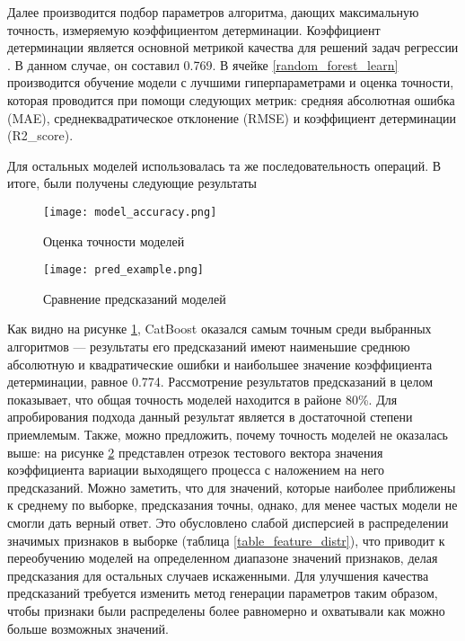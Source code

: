 Далее производится подбор параметров алгоритма, дающих максимальную точность, измеряемую коэффициентом детерминации. Коэффициент детерминации является основной метрикой качества для решений задач регрессии \cite{gomar2011validation}. В данном случае, он составил 0.769.
В ячейке \ref{random_forest_learn} производится обучение модели с лучшими гиперпараметрами и оценка точности, которая проводится при помощи следующих метрик:  средняя абсолютная ошибка (MAE), среднеквадратическое отклонение (RMSE) и коэффициент детерминации (R2\_score).

Для остальных моделей использовалась та же последовательность операций. В итоге, были получены следующие результаты
\begin{figure}[H]
	\centering
	\texttt{[image: model\_accuracy.png]}
	\caption{Оценка точности моделей}
	\label{model_accuracy}
\end{figure}
\begin{figure}[H]
	\centering
	\texttt{[image: pred\_example.png]}
	\caption{Сравнение предсказаний моделей}
	\label{pred_example}
\end{figure}
Как видно на рисунке \ref{model_accuracy}, CatBoost оказался самым точным среди выбранных алгоритмов --- результаты его предсказаний имеют наименьшие среднюю абсолютную и квадратические ошибки и наибольшее значение коэффициента детерминации, равное 0.774. Рассмотрение результатов предсказаний в целом показывает, что общая точность моделей находится в районе 80\%. Для апробирования подхода данный результат является в достаточной степени приемлемым. Также, можно предложить, почему точность моделей не оказалась выше: на рисунке \ref{pred_example} представлен отрезок тестового вектора значения коэффициента вариации выходящего процесса с наложением на него предсказаний. Можно заметить, что для значений, которые наиболее приближены к среднему по выборке, предсказания точны, однако, для менее частых модели не смогли дать верный ответ. Это обусловлено слабой дисперсией в распределении значимых признаков в выборке (таблица \ref{table_feature_distr}), что приводит к переобучению моделей на определенном диапазоне значений признаков, делая предсказания для остальных случаев искаженными. Для улучшения качества предсказаний требуется изменить метод генерации параметров таким образом, чтобы признаки были распределены более равномерно и охватывали как можно больше возможных значений.
\clearpage